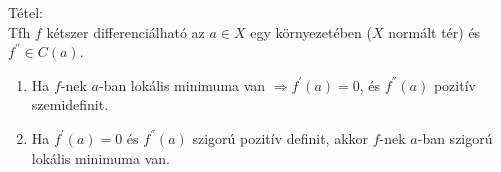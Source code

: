 \documentclass[12pt,a4paper]{scrartcl}
\providecommand{\tightlist}{%
  \setlength{\itemsep}{0pt}\setlength{\parskip}{0pt}}
\newenvironment{tetel}{}{}
\begin{document}
\begin{tetel}

Tétel:\\
Tfh \(f\) kétszer differenciálható az \(a \in X\) egy környezetében
(\(X\) normált tér) és \(f^{''} \in C\left( a \right)\).

\begin{enumerate}
\def\labelenumi{\arabic{enumi}.}
\tightlist
\item
  Ha \(f\)-nek \(a\)-ban lokális minimuma van
  \(\left. \Rightarrow f^{\prime}\left( a \right) = 0 \right.\), és
  \(f^{''}\left( a \right)\) pozitív szemidefinit.
\item
  Ha \(f^{\prime}\left( a \right) = 0\) és \(f^{''}\left( a \right)\)
  szigorú pozitív definit, akkor \(f\)-nek \(a\)-ban szigorú lokális
  minimuma van.
\end{enumerate}

\end{tetel}
\end{document}
